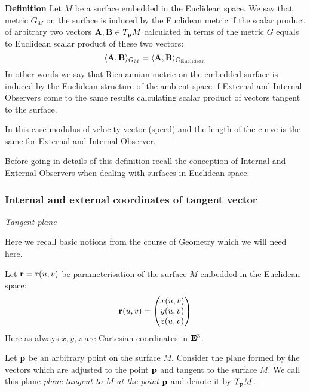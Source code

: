 \documentclass[12pt]{article}
\theoremstyle{theorem}
\numberwithin{equation}{section}
\begin{document}
 {\bf Definition}  Let $M$ be a surface embedded in the Euclidean space. We say that metric $G_M$ on the surface is
 induced by the Euclidean metric
if the scalar product of arbitrary two vectors ${\bf A,B}\in T_{\bf p} M$ calculated in terms of the metric $G$
equals to Euclidean scalar product of these two vectors:
          \begin{equation}\label{induced metric 1}
      \langle{\bf A,B}\rangle_{G_M}=\langle{\bf A,B}\rangle_{G_{\rm Euclidean}}
          \end{equation}
In other words  we say that Riemannian metric on the embedded surface is induced by the Euclidean structure of the ambient space
    if External and Internal Observers come to the same results calculating scalar product of vectors tangent to the surface.

    In this case modulus of velocity vector (speed) and the length of the curve is the same for
    External and Internal Observer.


Before going in details of this definition recall the conception of Internal and External Observers
when dealing with surfaces in Euclidean space:




\subsubsection {Internal and external coordinates of tangent vector}


\centerline {\it Tangent plane}

Here we recall basic notions from the course of Geometry which we will need here.

    Let ${\bf r}={\bf r}(u,v)$ be parameterisation of the surface $M$ embedded in the Euclidean space:
                           \begin{equation*}
                            {\bf r}(u,v)=\begin{pmatrix}x(u,v)\cr
                              y(u,v)\cr
                              z(u,v)\cr
                              \end{pmatrix}
                           \end{equation*}
Here as always $x,y,z$ are Cartesian coordinates in ${\bf E}^3$.



Let ${\bf p}$ be an arbitrary point on the surface $M$.
Consider the plane formed by the vectors which are adjusted to the point ${\bf p}$
and tangent to the surface $M$. We call this plane
{\it plane tangent to $M$ at the point ${\bf p}$ } and denote it by $T_{\bf p} M$.
\end{document}

